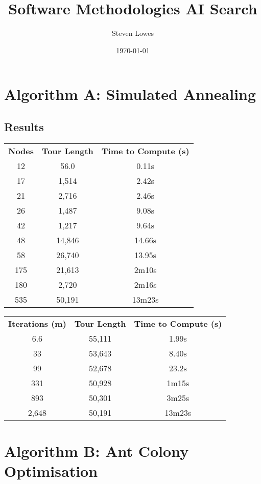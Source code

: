 \documentclass[a4paper, 11pt,table]{article}
\author{Steven Lowes}
\title{Software Methodologies AI Search}
\date{\today{}}
\begin{document}
	\section{Algorithm A: Simulated Annealing}
	
	\subsection{Results}
	\label{useCase:annealResults}
	\begin{center}
		\begin{tabu}{|c c c|}
			\textbf{Nodes} & \textbf{Tour Length} & \textbf{Time to Compute (s)}\\
			12 & 56.0 & 0.11s \\
			17 & 1,514 & 2.42s\\
			21 & 2,716 & 2.46s\\
			26 & 1,487 & 9.08s\\
			42 & 1,217 & 9.64s\\
			48 & 14,846 & 14.66s\\
			58 & 26,740 & 13.95s\\
			175 & 21,613 & 2m10s\\
			180 & 2,720 & 2m16s\\
			535 & 50,191 & 13m23s\\
		\end{tabu}
	\end{center}

\begin{center}
	\begin{tabu}{|c c c|}
		\textbf{Iterations (m)} & \textbf{Tour Length} & \textbf{Time to Compute (s)}\\
		6.6 & 55,111 & 1.99s\\
		33 & 53,643 & 8.40s\\
		99 & 52,678 & 23.2s\\
		331 & 50,928 & 1m15s\\
		893 & 50,301 & 3m25s\\
		2,648 & 50,191 & 13m23s \\
	\end{tabu}
\end{center}
	
	\section{Algorithm B: Ant Colony Optimisation}
	
\end{document}
